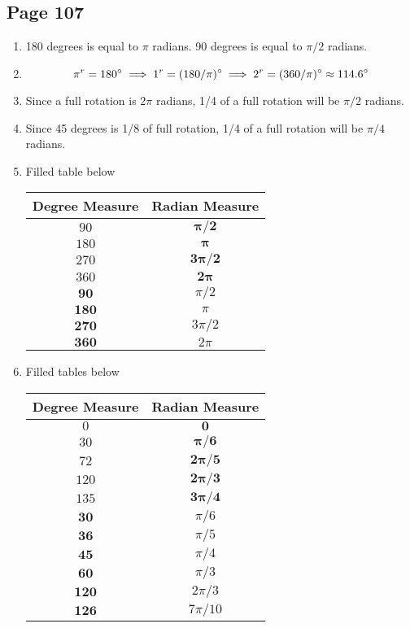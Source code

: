 \documentclass{article}
\newenvironment{solutions}[1]
{\subsection*{#1}
 \begin{enumerate}[leftmargin=1.5em]}
{\end{enumerate}}
\newcommand{\solution}{\item}
\begin{document}
\begin{solutions}{Page 107}
\solution %
180 degrees is equal to $\pi$ radians. 90 degrees is equal to $\pi/2$ radians.

\solution %
\[
\pi^r = 180\degree \implies 1^r = (180/\pi)\degree \implies 2^r = (360/\pi)\degree \approx 114.6\degree
\]

\solution %
Since a full rotation is $2\pi$ radians, 1/4 of a full rotation will be $\pi/2$ radians.

\solution %
Since 45 degrees is 1/8 of full rotation, 1/4 of a full rotation will be $\pi/4$ radians.

\solution %
Filled table below

\begin{center}
\bgroup
\def\arraystretch{1.1}
\setlength\tabcolsep{10pt}
\begin{tabular}{ |c|c| }
\hline
Degree Measure
& Radian Measure\\
\hline
$90$
& $\mathbf{\pi / 2}$\\
\hline
$180$
& $\mathbf{\pi}$\\
\hline
$270$
& $\mathbf{3\pi / 2}$\\
\hline
$360$
& $\mathbf{2\pi}$\\
\hline
$\mathbf{90}$
& $\pi / 2$\\
\hline
$\mathbf{180}$
& $\pi$\\
\hline
$\mathbf{270}$
& $3\pi / 2$\\
\hline
$\mathbf{360}$
& $2\pi$\\
\hline
\end{tabular}
\egroup
\end{center}

\solution %
Filled tables below

\begin{center}
\bgroup
\def\arraystretch{1.1}
\setlength\tabcolsep{10pt}
\begin{tabular}{ |c|c| }
\hline
Degree Measure
& Radian Measure\\
\hline
$0$
& $\mathbf{0}$\\
\hline
$30$
& $\mathbf{\pi/6}$\\
\hline
$72$
& $\mathbf{2\pi / 5}$\\
\hline
$120$
& $\mathbf{2\pi/3}$\\
\hline
$135$
& $\mathbf{3\pi / 4}$\\
\hline
$\mathbf{30}$
& $\pi/6$\\
\hline
$\mathbf{36}$
& $\pi / 5$\\
\hline
$\mathbf{45}$
& $\pi/4$\\
\hline
$\mathbf{60}$
& $\pi/3$\\
\hline
$\mathbf{120}$
& $2\pi/3$\\
\hline
$\mathbf{126}$
& $7\pi/10$\\
\hline
\end{tabular}
\egroup
\end{center}


\end{solutions}
\end{document}
